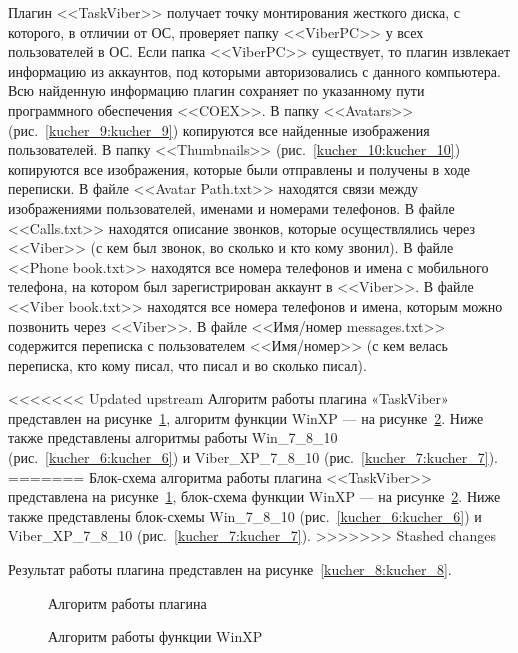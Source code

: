 Плагин <<TaskViber>> получает точку монтирования жесткого диска, с которого, в отличии от ОС, проверяет папку <<ViberPC>> у всех пользователей в ОС. Если папка <<ViberPC>> существует, то плагин извлекает информацию из аккаунтов, под которыми авторизовались с данного компьютера. Всю найденную информацию плагин сохраняет по указанному пути программного обеспечения <<COEX>>. В папку <<Avatars>> (рис.~\ref{kucher_9:kucher_9}) копируются все найденные изображения пользователей. В папку <<Thumbnails>> (рис.~\ref{kucher_10:kucher_10}) копируются все изображения, которые были отправлены и получены в ходе переписки. В файле <<Avatar Path.txt>> находятся связи между изображениями пользователей, именами и номерами телефонов. В файле <<Calls.txt>> находятся описание звонков, которые осуществлялись через <<Viber>> (с кем был звонок, во сколько и кто кому звонил). В файле <<Phone book.txt>> находятся все номера телефонов и имена с мобильного телефона, на котором был зарегистрирован аккаунт в <<Viber>>. В файле <<Viber book.txt>> находятся все номера телефонов и имена, которым можно позвонить через <<Viber>>. В файле <<Имя/номер messages.txt>> содержится переписка с пользователем <<Имя/номер>> (с кем велась переписка, кто кому писал, что писал и во сколько писал).

<<<<<<< Updated upstream
Алгоритм работы плагина «TaskViber» представлен на рисунке~\ref{kucher_4:kucher_4}, алгоритм функции WinXP --- на рисунке~\ref{kucher_5:kucher_5}. Ниже также представлены алгоритмы работы Win\_7\_8\_10 (рис.~\ref{kucher_6:kucher_6}) и Viber\_XP\_7\_8\_10 (рис.~\ref{kucher_7:kucher_7}).
=======
Блок-схема алгоритма работы плагина <<TaskViber>> представлена на рисунке~\ref{kucher_4:kucher_4}, блок-схема функции WinXP --- на рисунке~\ref{kucher_5:kucher_5}. Ниже также представлены блок-схемы Win\_7\_8\_10 (рис.~\ref{kucher_6:kucher_6}) и Viber\_XP\_7\_8\_10 (рис.~\ref{kucher_7:kucher_7}).
>>>>>>> Stashed changes

Результат работы плагина представлен на рисунке~\ref{kucher_8:kucher_8}.
 

\begin{figure}[h!]
\caption{ Алгоритм работы плагина }
\label{kucher_4:kucher_4}
\end{figure} 
  
\begin{figure}[h!]
\caption{ Алгоритм работы функции WinXP }
\label{kucher_5:kucher_5}
\end{figure} 

